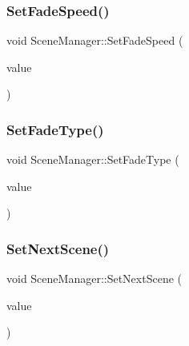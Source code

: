 \mbox{\label{class_scene_manager_aebb6b6cabf8a855982ddfd7571498369}} 
\subsubsection{\texorpdfstring{Set\+Fade\+Speed()}{SetFadeSpeed()}}
{\footnotesize\ttfamily void Scene\+Manager\+::\+Set\+Fade\+Speed (\begin{DoxyParamCaption}\item[{float}]{value }\end{DoxyParamCaption})\hspace{0.3cm}{\ttfamily [inline]}}

\mbox{\label{class_scene_manager_a6c209a6636f6139aec4f48c6555d6d47}} 
\subsubsection{\texorpdfstring{Set\+Fade\+Type()}{SetFadeType()}}
{\footnotesize\ttfamily void Scene\+Manager\+::\+Set\+Fade\+Type (\begin{DoxyParamCaption}\item[{\mbox{\hyperlink{class_fade_ac06f27215b454aa05b93c236476d6e80}{Fade\+::\+Type}}}]{value }\end{DoxyParamCaption})\hspace{0.3cm}{\ttfamily [inline]}}

\mbox{\label{class_scene_manager_ae01f4773bdbb6bf4159f0f5ab193b558}} 
\subsubsection{\texorpdfstring{Set\+Next\+Scene()}{SetNextScene()}}
{\footnotesize\ttfamily void Scene\+Manager\+::\+Set\+Next\+Scene (\begin{DoxyParamCaption}\item[{\mbox{\hyperlink{class_scene_bace}{Scene\+Bace}} $\ast$}]{value }\end{DoxyParamCaption})}


